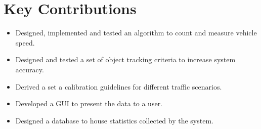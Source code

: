 \section{Key Contributions}


\begin{itemize}
    \item Designed, implemented and tested an algorithm to count and measure vehicle speed.
    \item Designed and tested a set of object tracking criteria to increase system accuracy.
    \item Derived a set a calibration guidelines for different traffic scenarios.
    \item Developed a GUI to present the data to a user.
    \item Designed a database to house statistics collected by the system.
\end{itemize}